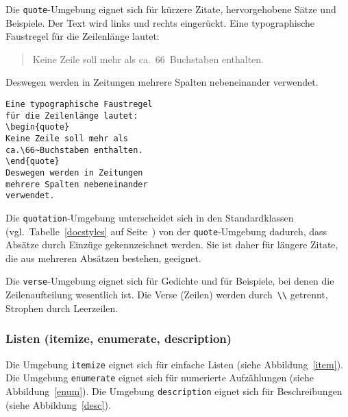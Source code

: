 Die \texttt{quote}-Umgebung eignet sich für kürzere Zitate,
hervorgehobene Sätze und Beispiele.
Der Text wird links und rechts eingerückt.
\exa
Eine typographische Faustregel
für die Zeilenlänge lautet:
\begin{quote}

Keine Zeile soll mehr als
ca.\ 66~Buchstaben enthalten.
\end{quote}
Deswegen werden in Zeitungen
mehrere Spalten nebeneinander
verwendet.
\exb 
\begin{verbatim}
Eine typographische Faustregel
für die Zeilenlänge lautet:
\begin{quote}
Keine Zeile soll mehr als
ca.\66~Buchstaben enthalten.
\end{quote}
Deswegen werden in Zeitungen
mehrere Spalten nebeneinander
verwendet.
\end{verbatim}
\exc

Die \texttt{quotation}-Umgebung unterscheidet sich in den
Standardklassen (vgl.\ Tabelle~\ref{docstyles} auf
Seite~\pageref{docstyles}) von der \texttt{quote}-Umgebung
dadurch, dass Absätze durch Einzüge gekennzeichnet werden.
Sie ist daher für längere Zitate, die aus mehreren Absätzen
bestehen, geeignet.

Die \texttt{verse}-Umgebung eignet sich für Gedichte und für
Beispiele, bei denen die Zeilenaufteilung wesentlich ist.  Die
Verse (Zeilen) werden durch~\verb|\\| getrennt, Strophen durch
Leerzeilen.


\subsubsection{Listen (itemize, enumerate, description)}
 
Die Umgebung \texttt{itemize} eignet sich für einfache Listen
(siehe Abbildung~\ref{item}).
Die Umgebung \texttt{enumerate} eignet sich für numerierte
Aufzählungen (siehe Abbildung~\ref{enum}).
Die Umgebung \texttt{description} eignet sich für Beschreibungen
(siehe Abbildung~\ref{desc}).

